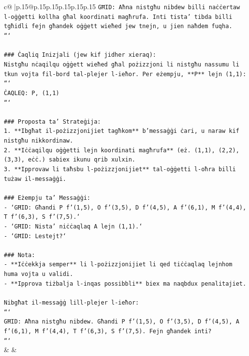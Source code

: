 \documentclass{article}
\begin{document}
{\begin{supertabular}{c@{$\;$}|p{.15\linewidth}@{}p{.15\linewidth}p{.15\linewidth}p{.15\linewidth}p{.15\linewidth}p{.15\linewidth}}
{{{\texttt{GĦID: Aħna nistgħu nibdew billi naċċertaw l{-}oġġetti kollha għal koordinati magħrufa. Inti tista' tibda billi tgħidli fejn għandek oġġett wieħed jew tnejn, u jien naħdem fuqha.} \\
\texttt{```} \\
\\ 
\texttt{\#\#\# Ċaqliq Inizjali (jew kif jidher xieraq):} \\
\texttt{Nistgħu nċaqilqu oġġett wieħed għal pożizzjoni li nistgħu nassumu li tkun vojta fil{-}bord tal{-}plejer l{-}ieħor. Per eżempju, **P** lejn (1,1):} \\
\texttt{```} \\
\texttt{ĊAQLEQ: P, (1,1)} \\
\texttt{```} \\
\\ 
\texttt{\#\#\# Proposta ta' Strateġija:} \\
\texttt{1. **Ibgħat il{-}pożizzjonijiet tagħkom** b'messaġġi ċari, u naraw kif nistgħu nikkordinaw.} \\
\texttt{2. **Iċċaqilqu oġġetti lejn koordinati magħrufa** (eż. (1,1), (2,2), (3,3), eċċ.) sabiex ikunu qrib xulxin.} \\
\texttt{3. **Ipprovaw li taħsbu l{-}pożizzjonijiet** tal{-}oġġetti l{-}oħra billi tużaw il{-}messaġġi.} \\
\\ 
\texttt{\#\#\# Eżempju ta' Messaġġi:} \\
\texttt{{-} `GĦID: Għandi P f'(1,5), O f'(3,5), D f'(4,5), A f'(6,1), M f'(4,4), T f'(6,3), S f'(7,5).`} \\
\texttt{{-} `GĦID: Nista' niċċaqlaq A lejn (1,1).`} \\
\texttt{{-} `GĦID: Lestejt?`} \\
\\ 
\texttt{\#\#\# Nota:} \\
\texttt{{-} **Iċċekkja semper** li l{-}pożizzjonijiet li qed tiċċaqlaq lejnhom huma vojta u validi.} \\
\texttt{{-} **Ipprova tiżbalja l{-}inqas possibbli** biex ma naqbdux penalitajiet.} \\
\\ 
\texttt{Nibgħat il{-}messaġġ lill{-}plejer l{-}ieħor:} \\
\texttt{```} \\
\texttt{GĦID: Aħna nistgħu nibdew. Għandi P f'(1,5), O f'(3,5), D f'(4,5), A f'(6,1), M f'(4,4), T f'(6,3), S f'(7,5). Fejn għandek inti?} \\
\texttt{```} \\
            }
        }
    }
    & & \\ \\


\end{supertabular}}
\end{document}
